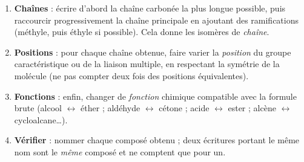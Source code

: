 \documentclass[11pt]{article}
\begin{document}
\begin{methode}
\begin{enumerate}
\item \textbf{Chaînes} : écrire d'abord la chaîne carbonée la plus longue possible, puis raccourcir progressivement la chaîne principale en ajoutant des ramifications (méthyle, puis éthyle si possible). Cela donne les isomères de \emph{chaîne}.
\item \textbf{Positions} : pour chaque chaîne obtenue, faire varier la \emph{position} du groupe caractéristique ou de la liaison multiple, en respectant la symétrie de la molécule (ne pas compter deux fois des positions équivalentes).
\item \textbf{Fonctions} : enfin, changer de \emph{fonction} chimique compatible avec la formule brute (alcool $\leftrightarrow$ éther ; aldéhyde $\leftrightarrow$ cétone ; acide $\leftrightarrow$ ester ; alcène $\leftrightarrow$ cycloalcane\ldots).
\item \textbf{Vérifier} : nommer chaque composé obtenu ; deux écritures portant le même nom sont le \emph{même} composé et ne comptent que pour un.
\end{enumerate}
\end{methode}
\end{document}
